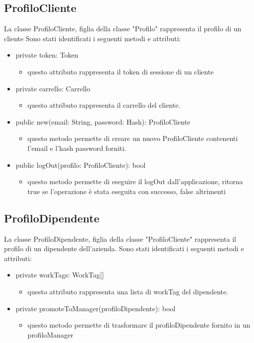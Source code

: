 \documentclass{report}
\begin{document}
\subsection*{ProfiloCliente}
La classe ProfiloCliente, figlia della classe "Profilo" rappresenta il profilo di un cliente
Sono stati identificati i seguenti metodi e attributi: 
\begin{itemize}
	\item private token: Token
	\begin{itemize}
		\item questo attributo rappresenta il token di sessione di un cliente
	\end{itemize}
	\item private carrello: Carrello
	\begin{itemize}
		\item questo attributo rappresenta il carrello del cliente.
	\end{itemize}
	\item public new(email: String, password: Hash): ProfiloCliente
	\begin{itemize}
		\item questo metodo permette di creare un nuovo ProfiloCliente contenenti l'email e l'hash password forniti.
	\end{itemize}
	\item public logOut(profilo: ProfiloCliente): bool
	\begin{itemize}
		\item questo metodo permette di eseguire il logOut dall'applicazione, ritorna true se l'operazione è stata eseguita con successo, false altrimenti
	\end{itemize}
\end{itemize}
\subsection*{ProfiloDipendente}
La classe ProfiloDipendente, figlia della classe "ProfiloCliente" rappresenta il profilo di un dipendente dell'azienda.
Sono stati identificati i seguenti metodi e attributi: 
\begin{itemize}
	\item private workTags: WorkTag[]
	\begin{itemize}
		\item questo attributo rappresenta una lista di workTag del dipendente.
	\end{itemize}
	\item private promoteToManager(profiloDipendente): bool
	\begin{itemize}
		\item questo metodo permette di trasformare il profiloDipendente fornito in un profiloManager
	\end{itemize}
\end{itemize}
\end{document}
